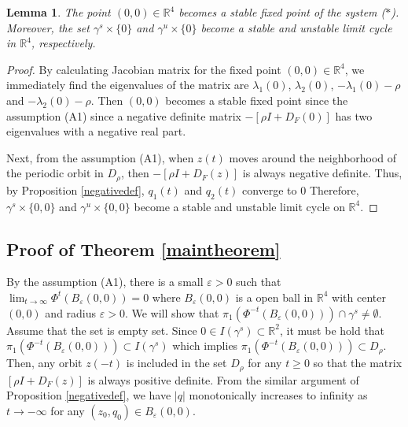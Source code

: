 \documentclass[11pt,reqno]{amsart}
\newtheorem{lemma}[theorem]{Lemma}
\begin{document}
 
\begin{lemma}
The point $(0,0)\in \mathbb{R}^4$ becomes a stable fixed point of the system ($\ast$). Moreover, the set $\gamma^s\times\{0\}$ and $\gamma^u\times\{0\}$ become a stable and unstable limit cycle in $\mathbb{R}^4$, respectively.   
\end{lemma}

\begin{proof}
By calculating Jacobian matrix for the fixed point $(0,0)\in \mathbb{R}^4$, we immediately find the eigenvalues of the matrix are $\lambda_1(0)$, $\lambda_2(0)$, $-\lambda_1(0)-\rho$ and $-\lambda_2(0)-\rho$. Then $(0,0)$ becomes a stable fixed point since the assumption (A1) since a negative definite matrix $-[\rho I+D_F(0)]$ has two eigenvalues with a negative real part.

Next, from the assumption (A1), when $z(t)$ moves around the neighborhood of the periodic orbit in $D_\rho$, then $-[\rho I+D_F(z)]$ is always negative definite. Thus, by Proposition \ref{negativedef}, $q_1(t)$ and $q_2(t)$ converge to $0$ Therefore, $\gamma^s\times\{0,0\}$ and $\gamma^u\times\{0,0\}$ become a stable and unstable limit cycle on $\mathbb{R}^4$. 
\end{proof}



\subsection*{\bf Proof of Theorem \ref{maintheorem}}

By the assumption (A1), there is a small $\varepsilon>0$ such that $\displaystyle\lim_{t\to\infty}\Phi^t(B_\varepsilon(0,0))=0$ where $B_\varepsilon(0,0)$ is a open ball in $\mathbb{R}^4$ with center $(0,0)$ and radius $\varepsilon>0$. We will show that $\pi_1(\Phi^{-t}(B_\varepsilon(0,0)))\cap \gamma^s \neq \emptyset$. Assume that the set is empty set. Since $0\in I(\gamma^s)\subset \mathbb{R}^2$, it must be hold that $\pi_1(\Phi^{-t}(B_\varepsilon(0,0)))\subset I(\gamma^s)$ which implies $\pi_1(\Phi^{-t}(B_\varepsilon(0,0)))\subset D_\rho$. Then, any orbit $z(-t)$ is included in the set $D_\rho$ for any $t\geq 0$ so that the matrix $[\rho I+D_F(z)]$ is always positive definite. From the similar argument of Proposition \ref{negativedef}, we have $|q|$ monotonically increases to infinity as $t\to-\infty$ for any $(z_0,q_0)\in B_\varepsilon(0,0)$. 
\end{document}
